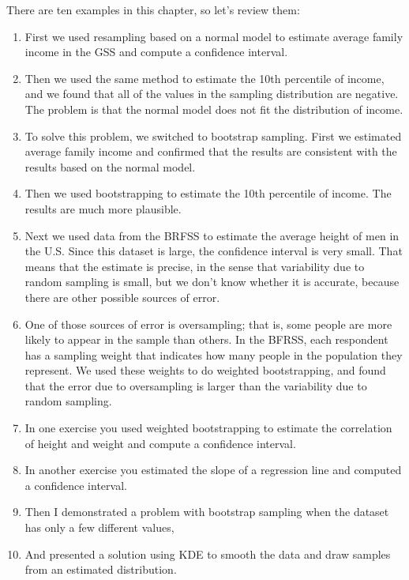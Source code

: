 There are ten examples in this chapter, so let's review them:

\begin{enumerate}
\def\labelenumi{\arabic{enumi}.}
\item
  First we used resampling based on a normal model to estimate average
  family income in the GSS and compute a confidence interval.
\item
  Then we used the same method to estimate the 10th percentile of
  income, and we found that all of the values in the sampling
  distribution are negative. The problem is that the normal model does
  not fit the distribution of income.
\item
  To solve this problem, we switched to bootstrap sampling. First we
  estimated average family income and confirmed that the results are
  consistent with the results based on the normal model.
\item
  Then we used bootstrapping to estimate the 10th percentile of income.
  The results are much more plausible.
\item
  Next we used data from the BRFSS to estimate the average height of men
  in the U.S. Since this dataset is large, the confidence interval is
  very small. That means that the estimate is precise, in the sense that
  variability due to random sampling is small, but we don't know whether
  it is accurate, because there are other possible sources of error.
\item
  One of those sources of error is oversampling; that is, some people
  are more likely to appear in the sample than others. In the BFRSS,
  each respondent has a sampling weight that indicates how many people
  in the population they represent. We used these weights to do weighted
  bootstrapping, and found that the error due to oversampling is larger
  than the variability due to random sampling.
\item
  In one exercise you used weighted bootstrapping to estimate the
  correlation of height and weight and compute a confidence interval.
\item
  In another exercise you estimated the slope of a regression line and
  computed a confidence interval.
\item
  Then I demonstrated a problem with bootstrap sampling when the dataset
  has only a few different values,
\item
  And presented a solution using KDE to smooth the data and draw samples
  from an estimated distribution.
\end{enumerate}

